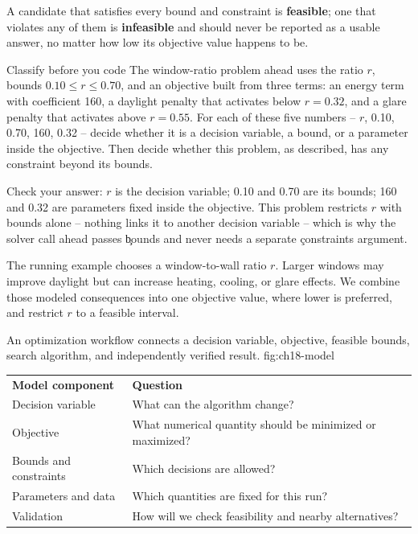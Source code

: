 A candidate that satisfies every bound and constraint is \textbf{feasible}; one
that violates any of them is \textbf{infeasible} and should never be reported as
a usable answer, no matter how low its objective value happens to be.

\begin{TryBox}{Classify before you code}
The window-ratio problem ahead uses the ratio $r$, bounds
$0.10 \le r \le 0.70$, and an objective built from three terms: an energy term
with coefficient 160, a daylight penalty that activates below $r = 0.32$, and a
glare penalty that activates above $r = 0.55$. For each of these five numbers
-- $r$, 0.10, 0.70, 160, 0.32 -- decide whether it is a decision variable, a
bound, or a parameter inside the objective. Then decide whether this problem,
as described, has any constraint beyond its bounds.
\end{TryBox}

Check your answer: $r$ is the decision variable; 0.10 and 0.70 are its bounds;
160 and 0.32 are parameters fixed inside the objective. This problem restricts
$r$ with bounds alone -- nothing links it to another decision variable -- which
is why the solver call ahead passes \c{bounds} and never needs a separate
\c{constraints} argument.


The running example chooses a window-to-wall ratio $r$. Larger windows may
improve daylight but can increase heating, cooling, or glare effects. We combine
those modeled consequences into one objective value, where lower is preferred,
and restrict $r$ to a feasible interval.

{An optimization workflow connects a decision variable, objective, feasible bounds, search algorithm, and independently verified result.}
{fig:ch18-model}

\begin{center}
\begin{tabular}{ll}
\textbf{Model component} & \textbf{Question} \\
Decision variable & What can the algorithm change? \\
Objective & What numerical quantity should be minimized or maximized? \\
Bounds and constraints & Which decisions are allowed? \\
Parameters and data & Which quantities are fixed for this run? \\
Validation & How will we check feasibility and nearby alternatives? \\
\end{tabular}
\end{center}

